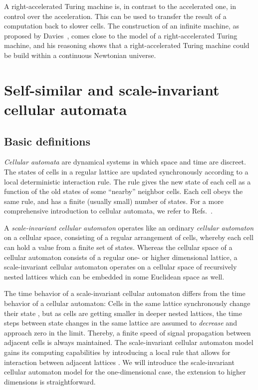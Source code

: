 \documentclass[pre,showpacs,showkeys,preprint]{revtex4}
\theoremstyle{definition}
\begin{document}
A right-accelerated Turing machine is, in contrast to the accelerated one, in control over
the acceleration.
This can be used to transfer the result of a computation back to slower cells.
The construction of an infinite machine, as proposed by Davies~\cite{Davies01}, comes close to the model of a right-accelerated Turing machine,
and his reasoning shows that a right-accelerated Turing machine could be build within a continuous Newtonian universe.

\section{Self-similar and scale-invariant cellular automata}
\label{chap:sica}

\subsection{Basic definitions}

\emph{Cellular automata} are dynamical systems in which space and time are discreet.
The states of cells in a regular lattice are updated synchronously according to a local deterministic
interaction rule.
The rule gives the new state of each cell as a function of the old states of some ``nearby'' neighbor cells.
Each cell obeys the same rule, and has a finite (usually small) number of states.
For a more comprehensive introduction to cellular automata, we refer to Refs.~\cite{v-neumann-66,wolfram-86,gutowitz,ilachinski01,wolfram-2002}.

A {\em scale-invariant cellular automaton}  operates like an ordinary
{\em cellular automaton}  on a cellular space, consisting of a regular arrangement of cells,
whereby each cell can hold a value from a finite set of states.
Whereas the cellular space of a cellular automaton consists of a regular one- or higher
dimensional lattice, a scale-invariant cellular automaton operates on a cellular space of recursively nested lattices
which can be embedded in some Euclidean space as well.

The time behavior of a scale-invariant cellular automaton differs from the time behavior of a cellular automaton:
Cells in the same lattice synchronously change their state \cite{Morelli_Zanette}, but
as cells are getting smaller in deeper nested lattices, the time steps between state changes in
the same lattice are assumed to {\em decrease} and approach zero in the limit.
Thereby, a finite speed of signal propagation between adjacent cells is always maintained.
The scale-invariant cellular automaton model gains its  computing capabilities by introducing a local rule that
allows for interaction between adjacent lattices \cite{BoFeng_MengDing}.
We will introduce the scale-invariant cellular automaton model for the one-dimensional case, the extension to higher dimensions
\cite{Brunnet_Chate} is
straightforward.
\end{document}
